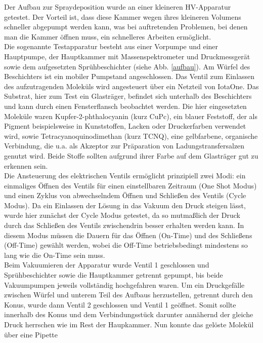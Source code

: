 Der Aufbau zur Spraydeposition wurde an einer kleineren HV-Apparatur getestet. %
Der
Vorteil ist, dass diese Kammer wegen ihres kleineren Volumens schneller abgepumpt werden kann, was bei
auftretenden Problemen, bei denen man die Kammer öffnen muss, ein schnelleres Arbeiten ermöglicht.\\
Die sogenannte Testapparatur besteht aus einer Vorpumpe und  einer Hauptpumpe,
der Hauptkammer mit Massenspektrometer und Druckmessgerät sowie dem aufgesetzten
Sprühbeschichter (siehe Abb. \ref{aufbau}). Am Würfel des Beschichters ist ein mobiler Pumpstand
angeschlossen.
Das Ventil zum Einlassen des aufzutragenden Moleküls wird angesteuert über ein Netzteil von IotaOne. Das
Substrat, hier zum Test ein Glasträger, befindet sich unterhalb des Beschichters und kann durch einen
Fensterflansch beobachtet werden. Die hier eingesetzten Moleküle waren Kupfer-2-phthalocyanin (kurz
CuPc), ein blauer Feststoff, der als Pigment
beispielsweise in Kunststoffen, Lacken oder
Druckerfarben verwendet wird, sowie 
Tetracyanoquinodimethan (kurz TCNQ), eine gelbfarbene,
organische Verbindung, die u.a. als Akzeptor zur Präparation von Ladungstransfersalzen genutzt wird.
Beide Stoffe sollten aufgrund ihrer Farbe auf dem Glasträger gut zu erkennen sein. \\
Die Ansteuerung des elektrischen Ventils ermöglicht
prinzipiell zwei Modi: ein einmaliges Öffnen des
Ventils für einen einstellbaren Zeitraum (One
Shot Modus) und einen Zyklus von abwechselndem
Öffnen und Schließen des Ventils (Cycle Modus).
Da ein Einlassen der Lösung in das Vakuum
den Druck steigen lässt, wurde hier
zunächst der Cycle Modus getestet, da so
mutmaßlich der Druck durch das Schließen des
Ventils zwischendrin besser erhalten werden
kann. In diesem Modus müssen die Dauern für das
Öffnen (On-Time) und des Schließens (Off-Time)
gewählt werden, wobei die Off-Time
betriebsbedingt mindestens so lang wie die
On-Time sein muss.\\
Beim Vakuumieren der Apparatur wurde Ventil 1
 geschlossen und Sprühbeschichter sowie die 
 Hauptkammer getrennt gepumpt, bis beide
 Vakuumpumpen jeweils vollständig hochgefahren
 waren.
 Um ein Druckgefälle zwischen Würfel und unterem
 Teil des Aufbaus herzustellen, getrennt durch den
 Konus, wurde dann Ventil 2 geschlossen und
 Ventil 1 geöffnet.
 Somit sollte innerhalb des Konus und dem
 Verbindungsstück darunter annähernd der gleiche
 Druck herrschen wie im Rest der Haupkammer.
 Nun konnte das gelöste Molekül über eine Pipette
